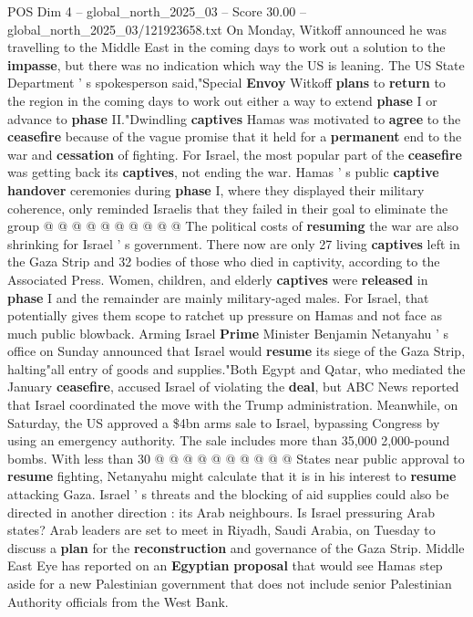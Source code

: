 \begin{textsample}{POS Dim 4 – global\_north\_2025\_03 – Score 30.00 – global\_north\_2025\_03/121923658.txt}
On Monday, Witkoff announced he was travelling to the Middle East in the coming days to work out a solution to the \textbf{impasse}, but there was no indication which way the US is leaning.
The US State Department ' s spokesperson said,"Special \textbf{Envoy} Witkoff \textbf{plans} to \textbf{return} to the region in the coming days to work out either a way to extend \textbf{phase} I or advance to \textbf{phase} II."Dwindling \textbf{captives} Hamas was motivated to \textbf{agree} to the \textbf{ceasefire} because of the vague promise that it held for a \textbf{permanent} end to the war and \textbf{cessation} of fighting.
For Israel, the most popular part of the \textbf{ceasefire} was getting back its \textbf{captives}, not ending the war.
Hamas ' s public \textbf{captive} \textbf{handover} ceremonies during \textbf{phase} I, where they displayed their military coherence, only reminded Israelis that they failed in their goal to eliminate the group @ @ @ @ @ @ @ @ @ @ The political costs of \textbf{resuming} the war are also shrinking for Israel ' s government.
There now are only 27 living \textbf{captives} left in the Gaza Strip and 32 bodies of those who died in captivity, according to the Associated Press.
Women, children, and elderly \textbf{captives} were \textbf{released} in \textbf{phase} I and the remainder are mainly military-aged males.
For Israel, that potentially gives them scope to ratchet up pressure on Hamas and not face as much public blowback.
Arming Israel \textbf{Prime} Minister Benjamin Netanyahu ' s office on Sunday announced that Israel would \textbf{resume} its siege of the Gaza Strip, halting"all entry of goods and supplies."Both Egypt and Qatar, who mediated the January \textbf{ceasefire}, accused Israel of violating the \textbf{deal}, but ABC News reported that Israel coordinated the move with the Trump administration.
Meanwhile, on Saturday, the US approved a \$4bn arms sale to Israel, bypassing Congress by using an emergency authority.
The sale includes more than 35,000 2,000-pound bombs.
With less than 30 @ @ @ @ @ @ @ @ @ @ States near public approval to \textbf{resume} fighting, Netanyahu might calculate that it is in his interest to \textbf{resume} attacking Gaza.
Israel ' s threats and the blocking of aid supplies could also be directed in another direction : its Arab neighbours.
Is Israel pressuring Arab states?
Arab leaders are set to meet in Riyadh, Saudi Arabia, on Tuesday to discuss a \textbf{plan} for the \textbf{reconstruction} and governance of the Gaza Strip.
Middle East Eye has reported on an \textbf{Egyptian} \textbf{proposal} that would see Hamas step aside for a new Palestinian government that does not include senior Palestinian Authority officials from the West Bank.

\end{textsample}
